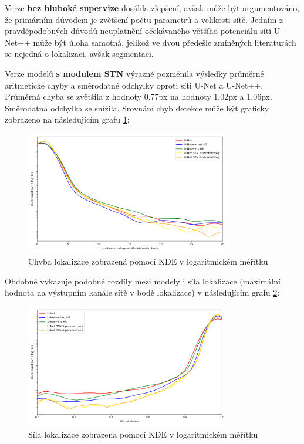 Verze \textbf{bez hluboké supervize} dosáhla zlepšení, avšak může být argumentováno, že primárním důvodem je zvětšení počtu parametrů a velikosti sítě. Jedním z pravděpodobných důvodů neuplatnění očekávaného většího potenciálu sítí U-Net++ může být úloha samotná, jelikož ve dvou předešle zmíněných literaturách se nejedná o lokalizaci, avšak segmentaci.

Verze modelů \textbf{s modulem STN} výrazně pozměnila výsledky průměrné aritmetické chyby a směrodatné odchylky oproti síti U-Net a U-Net++. Průměrná chyba se zvětšila z hodnoty 0,77px na hodnoty 1,02px a 1,06px. Směrodatná odchylka se snížila. Srovnání chyb detekce může být graficky zobrazeno na následujícím grafu \ref{fig:loc_distance}:
\pagebreak
\begin{figure}[ht]
\centering
\includegraphics[width=0.8\textwidth,keepaspectratio]{Figures/plots/loc_distance.png}
\caption[Chyba lokalizace modelů]{Chyba lokalizace zobrazená pomocí KDE v logaritmickém měřítku }
\label{fig:loc_distance}
\end{figure}

Obdobně vykazuje podobné rozdíly mezi modely i síla lokalizace (maximální hodnota na výstupním kanále sítě v bodě lokalizace) v následujícím grafu \ref{fig:loc_strength}:

\begin{figure}[H]
\centering
\includegraphics[width=0.8\textwidth,keepaspectratio]{Figures/plots/loc_strength.png}
\caption[Síla lokalizace modelů]{Síla lokalizace zobrazena pomocí KDE v logaritmickém měřítku }
\label{fig:loc_strength}
\end{figure}

